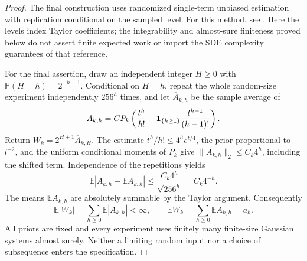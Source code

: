\begin{proof}
The final construction uses randomized single-term unbiased estimation
with replication conditional on the sampled level. For this method, see
\cite[Section~2, equation~(10), and Section~4]{RheeGlynn2015}.
Here the levels index Taylor coefficients; the integrability and
almost-sure finiteness proved below do not assert finite expected work
or import the SDE complexity guarantees of that reference.

For the final assertion, draw an independent integer \(H\ge0\) with
\(\mathbb P(H=h)=2^{-h-1}\). Conditional on \(H=h\), repeat the whole
random-size experiment independently \(256^h\) times, and let
\(\overline A_{k,h}\) be the sample average of
\[
 A_{k,h}=CP_k\left(
   \frac{t^h}{h!}
   -{\bf1}_{\{h\ge1\}}\frac{t^{h-1}}{(h-1)!}\right).
\]
Return \(W_k=2^{H+1}\overline A_{k,H}\).
The estimate \(t^h/h!\le4^h e^{t/4}\), the prior proportional to
\(l^{-2}\), and the uniform conditional moments of \(P_k\) give
\(\|A_{k,h}\|_2\le C_k4^h\), including the shifted term.
Independence of the repetitions yields
\[
 \mathbb E\left|
  \overline A_{k,h}-\mathbb EA_{k,h}\right|
 \le\frac{C_k4^h}{\sqrt{256^h}}=C_k4^{-h}.
\]
The means \(\mathbb EA_{k,h}\) are absolutely summable by the Taylor
argument. Consequently
\[
 \mathbb E|W_k|
 =\sum_{h\ge0}\mathbb E|\overline A_{k,h}|<\infty,
 \qquad
 \mathbb EW_k=\sum_{h\ge0}\mathbb EA_{k,h}=a_k.
\]
All priors are fixed and every experiment uses finitely many finite-size
Gaussian systems almost surely. Neither a limiting random input nor a
choice of subsequence enters the specification.
\end{proof}

